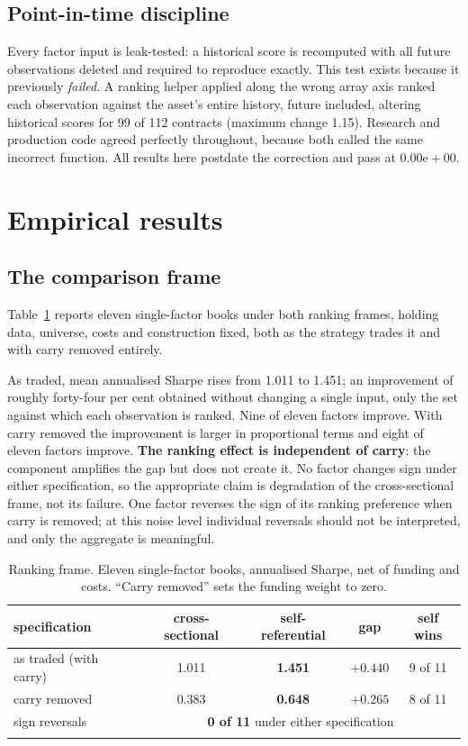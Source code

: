 \documentclass[11pt,letterpaper]{article}
\begin{document}
\subsection{Point-in-time discipline}

Every factor input is leak-tested: a historical score is recomputed with all
future observations deleted and required to reproduce exactly. This test exists
because it previously \emph{failed}. A ranking helper applied along the wrong
array axis ranked each observation against the asset's entire history, future
included, altering historical scores for 99 of 112 contracts (maximum change 1.15). Research and
production code agreed perfectly throughout, because both called the same
incorrect function. All results here postdate the correction and pass at
$0.00\mathrm{e}{+}00$.

\section{Empirical results}

\subsection{The comparison frame}
\label{sec:frame}

Table~\ref{tab:frame} reports eleven single-factor books under both ranking
frames, holding data, universe, costs and construction fixed, both as the
strategy trades it and with carry removed entirely.

As traded, mean annualised Sharpe rises from 1.011 to 1.451; an improvement of
roughly forty-four per cent obtained without changing a single input, only the
set against which each observation is ranked. Nine of eleven factors improve.
With carry removed the improvement is larger in proportional terms and eight of
eleven factors improve. \textbf{The ranking effect is independent of carry}: the
component amplifies the gap but does not create it. No factor changes sign under
either specification, so the appropriate claim is degradation of the
cross-sectional frame, not its failure. One factor reverses the sign of its
ranking preference when carry is removed; at this noise level individual
reversals should not be interpreted, and only the aggregate is meaningful.

\begin{table}[!htbp]\centering
\caption{Ranking frame. Eleven single-factor books, annualised Sharpe, net of
funding and costs. ``Carry removed'' sets the funding weight to zero.}
\label{tab:frame}
\begin{tabular}{lcccc}
\toprule
specification & cross-sectional & self-referential & gap & self wins \\
\midrule\addlinespace[2pt]
as traded (with carry) & 1.011 & \textbf{1.451} & $+0.440$ & 9 of 11 \\
carry removed & 0.383 & \textbf{0.648} & $+0.265$ & 8 of 11 \\
\midrule\addlinespace[2pt]
sign reversals & \multicolumn{4}{c}{\textbf{0 of 11} under either specification} \\
\addlinespace[2pt]
\bottomrule
\end{tabular}
\end{table}
\end{document}

